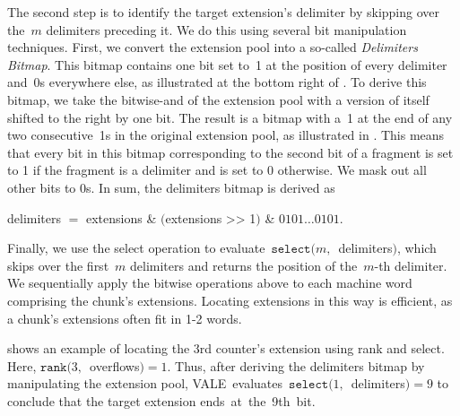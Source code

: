 \documentclass[sigconf]{acmart}
\newcommand{\counterencodingabbrv}{VALE}
\begin{document}
The second step is to identify the target extension's delimiter by skipping
over the~$m$ delimiters preceding it. We do this using several bit manipulation
techniques. First, we convert the extension pool into a so-called
\emph{Delimiters Bitmap}. This bitmap contains one bit set to~1 at the position
of every delimiter and~0s everywhere else, as illustrated at the bottom right
of . To derive this bitmap, we take the
bitwise-and of the extension pool with a version of itself shifted to the right
by one bit. The result is a bitmap with a~1 at the end of any two
consecutive~1s in the original extension pool, as illustrated in
. This means that every bit in this bitmap
corresponding to the second bit of a fragment is set to 1 if the fragment is a
delimiter and is set to 0 otherwise. We mask out all other bits to 0s. In sum,
the delimiters bitmap is derived as
\begin{center}
    delimiters $=$ extensions \& $($extensions >‌> 1$)$ \& $0101\dots0101$.
\end{center}
Finally, we use the select operation to
evaluate~$\texttt{select}(m,$~delimiters$)$, which skips over the first~$m$
delimiters and returns the position of the~$m${\nobreakdash-}th delimiter. We
sequentially apply the bitwise operations above to each machine word comprising
the chunk's extensions. Locating extensions in this way is efficient, as a
chunk's extensions often fit in 1-2 words. 

 shows an example of locating the 3rd
counter's extension using rank and select. Here,
$\texttt{rank}(3,$~overflows$)=1$. Thus, after deriving the delimiters bitmap
by manipulating the extension pool, \counterencodingabbrv\
evaluates~$\texttt{select}(1,$~delimiters$)=9$ to conclude that the target
extension ends~at~the~9th~bit.
\end{document}
